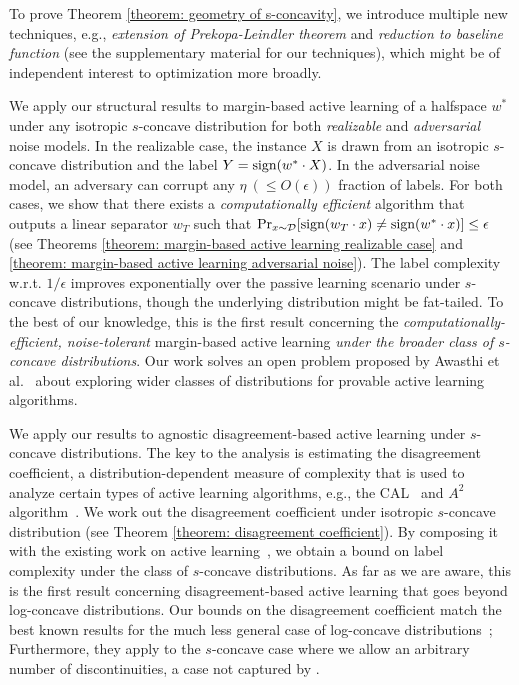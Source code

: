 \documentclass[11pt]{article}
\newcommand{\cD}{\mathcal{D}}
\newcommand{\sign}{\textup{sign}}
\begin{document}
To prove Theorem \ref{theorem: geometry of s-concavity}, we introduce multiple new techniques, e.g., \emph{extension of Prekopa-Leindler theorem} and \emph{reduction to baseline function} (see the supplementary material for our techniques), which might be of independent interest to optimization more broadly.


\medskip
{} We apply our structural results to margin-based active learning of a halfspace $w^*$ under any isotropic $s$-concave distribution for both \emph{realizable} and \emph{adversarial} noise models. In the realizable case, the instance $X$ is drawn from an isotropic $s$-concave distribution and the label $Y=\sign(w^*\cdot X)$. In the adversarial noise model, an adversary can corrupt any $\eta\ (\le O(\epsilon))$ fraction of labels. For both cases, we show that there exists a \emph{computationally efficient} algorithm that outputs a linear separator $w_T$ such that $\Pr_{x\sim \cD}[\sign(w_T\cdot x)\not=\sign(w^*\cdot x)]\le\epsilon$ (see Theorems \ref{theorem: margin-based active learning realizable case} and \ref{theorem: margin-based active learning adversarial noise}). The label complexity w.r.t. $1/\epsilon$ improves exponentially over the passive learning scenario under $s$-concave distributions, though the underlying distribution might be fat-tailed. To the best of our knowledge, this is the first result concerning the \emph{computationally-efficient, noise-tolerant} margin-based active learning \emph{under the broader class of $s$-concave distributions}. Our work solves an open problem proposed by Awasthi et al.~\cite{awasthi2017power} about exploring wider classes of distributions for provable active learning algorithms.


\medskip
{} We apply our results to agnostic disagreement-based active learning under $s$-concave distributions. The key to the analysis is estimating the disagreement coefficient, a distribution-dependent measure of complexity that is used to analyze certain types of active learning algorithms, e.g., the CAL~\cite{cohn1994improving} and $A^2$ algorithm~\cite{balcan2009agnostic}. We work out the disagreement coefficient under isotropic $s$-concave distribution (see Theorem \ref{theorem: disagreement coefficient}). By composing it with the existing work on active learning~\cite{dasgupta2007general}, we obtain a bound on label complexity under the class of $s$-concave distributions. As far as we are aware, this is the first result concerning disagreement-based active learning that goes beyond log-concave distributions. Our bounds on the disagreement coefficient match the best known results for the much less general case of log-concave distributions~\cite{balcan2013active}; Furthermore, they apply to the $s$-concave case where we allow an arbitrary number of discontinuities, a case not captured by \cite{friedman2009active}.
\end{document}
